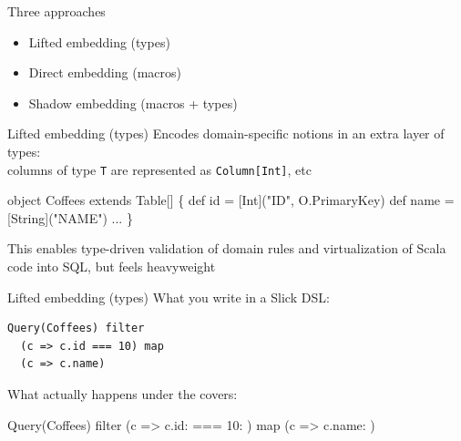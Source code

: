 \documentclass{beamer}
\begin{document}
\begin{frame}{Three approaches}
  \begin{itemize}
  \item Lifted embedding (types)
  \item Direct embedding (macros)
  \item Shadow embedding (macros + types)
  \end{itemize}
\end{frame}

\begin{frame}[fragile]{Lifted embedding (types)}
  Encodes domain-specific notions in an extra layer of types:\\
  columns of type \texttt{T} are represented as \texttt{Column[Int]}, etc

  \vspace{1em}
  \begin{semiverbatim}
object Coffees extends Table[\text{\color{blue}{(Int, String, ...)}}] \{
  def id = \text{\color{blue}{column}}[Int]("ID", O.PrimaryKey)
  def name = \text{\color{blue}{column}}[String]("NAME")
  ...
\}
  \end{semiverbatim}

  This enables type-driven validation of domain rules
  and virtualization of Scala code into SQL, but feels heavyweight
\end{frame}

\begin{frame}[fragile]{Lifted embedding (types)}
  What you write in a Slick DSL:
  \vspace{1em}
  \begin{verbatim}
Query(Coffees) filter
  (c => c.id === 10) map
  (c => c.name)
  \end{verbatim}

  What actually happens under the covers:
  \vspace{1em}
  \begin{semiverbatim}
Query(Coffees) filter
  (c => c.id: \text{\color{blue}{Column[Int]}} === 10: \text{\color{blue}{Column[Int]}}) map
  (c => c.name: \text{\color{blue}{Column[String]}})
  \end{semiverbatim}
\end{frame}
\end{document}
